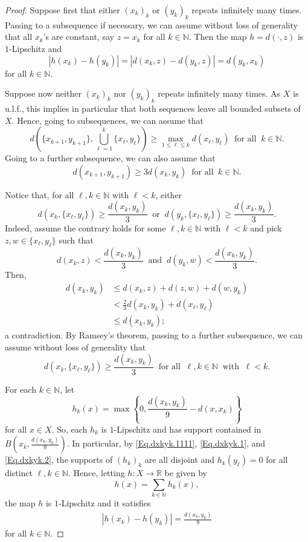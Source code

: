 \documentclass[11pt]{amsart}
\newcommand{\R}{\mathbb{R}}
\newcommand{\N}{\mathbb{N}}
\numberwithin{equation}{section}
\theoremstyle{definition}
\theoremstyle{remark}
\begin{document}
\begin{proof}
Suppose first that either $(x_k)_k$ or $(y_k)_k$ repeats infinitely many times. Passing to a subsequence if necessary, we can assume without loss of generality that  all $x_k$'s are constant, say $z=x_k$ for all $k\in\N$. Then the map $h=d(\cdot, z)$ is $1$-Lipschitz and
\[|h(x_k)-h(y_k)|=|d(x_k,z)-d(y_k,z)|=d(y_k,x_k)\]
for all $k\in\N$.

Suppose now neither   $(x_k)_k$ nor $(y_k)_k$ repeats infinitely many times. As $X$ is u.l.f., this implies in particular that both sequences leave all bounded subsets of $X$. Hence, going to subsequences, we  can assume that
\begin{equation}\label{Eq.dxkyk.1111}d\left(\{x_{k+1},y_{k+1}\},\bigcup_{\ell=1}^k\{x_\ell,y_\ell\}\right)\geq\max_{1\leq \ell\leq k}d(x_\ell,y_\ell)\ \text{ for all }\ k\in\N. \end{equation}
Going to a further subsequence, we can also assume that 
\begin{equation}\label{Eq.dxkyk.1} d(x_{k+1},y_{k+1})\geq 3d(x_k,y_k) \ \text{ for all }\ k\in\N.\end{equation}


Notice that, for all $\ell,k\in\N$ with $\ell< k$, either
 \[d(x_{k},\{x_\ell,y_\ell\}) \geq \frac{d(x_{k},y_{k})}{3}\  \text{ or }\  d(y_{k},\{x_\ell,y_\ell\}) \geq \frac{d(x_{k},y_{k})}{3}.\]
Indeed, assume the contrary holds for some $\ell,k\in\N$ with $\ell<k$ and pick $z,w\in \{x_\ell,y_\ell\}$ such that
 \[d(x_{k},z)<\frac{d(x_{k},y_{k})}{3}\ \text{ and }\ d(y_{k},w)<\frac{d(x_{k},y_{k})}{3}. \]
Then,
 \begin{align*}
    d(x_{k},y_{k})&\leq d(x_{k},z)+d(z,w)+d(w,y_{k})\\
    &<\frac{2}{3}d(x_{k},y_{k})+d(x_\ell,y_\ell)\\
    &\leq d(x_{k},y_{k});
\end{align*}
a contradiction. By Ramsey's theorem, passing to a further subsequence, we can assume without loss of generality that\begin{equation}\label{Eq.dxkyk.2}d(x_{k},\{x_\ell,y_\ell\}) \geq \frac{d(x_{k},y_{k})}{3}
\ \text{ for all }\ \ell,k\in\N\ \text{ with }\ \ell <k.
\end{equation}


For each $k\in\N$, let
\[h_{k}(x)=\max\left\{0, \frac{d(x_{k},y_{k})}{9}  -d(x,x_k)\right\}\]
for all $x\in X$. So,   each $h_k$   is $1$-Lipschitz and has support contained in $B(x_k,\tfrac{d(x_k,y_k)}{9})$. In particular, by \eqref{Eq.dxkyk.1111}, \eqref{Eq.dxkyk.1}, and \eqref{Eq.dxkyk.2}, the supports of $(h_{k})_k$  are all disjoint and $h_k(y_\ell)=0$ for all distinct $\ell,k\in \N$. Hence, letting   $h\colon X\to \R$ be given by
\[h(x)=\sum_{k\in\N}h_{k}(x),\]
the map $h$ is   $1$-Lipschitz and it satisfies
\begin{align*}|h(x_{k})-h(y_{k})|=\frac{d(x_k,y_k)}{9}  \end{align*}
for all $k\in\N$.
 \end{proof}
\end{document}
